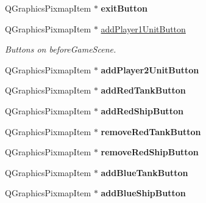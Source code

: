 \begin{DoxyCompactItemize}
\item 
Q\+Graphics\+Pixmap\+Item $\ast$ {\bfseries exit\+Button}\hypertarget{class_game_menu_a76bcbc6a772fb628f39140c9365eccd8}{}\label{class_game_menu_a76bcbc6a772fb628f39140c9365eccd8}

\item 
Q\+Graphics\+Pixmap\+Item $\ast$ \hyperlink{class_game_menu_aedcd8869665d66f9489ab41f0c038df8}{add\+Player1\+Unit\+Button}\hypertarget{class_game_menu_aedcd8869665d66f9489ab41f0c038df8}{}\label{class_game_menu_aedcd8869665d66f9489ab41f0c038df8}

\begin{DoxyCompactList}\small\item\em Buttons on before\+Game\+Scene. \end{DoxyCompactList}\item 
Q\+Graphics\+Pixmap\+Item $\ast$ {\bfseries add\+Player2\+Unit\+Button}\hypertarget{class_game_menu_a1027a5d9f67523cee6782d6413a75281}{}\label{class_game_menu_a1027a5d9f67523cee6782d6413a75281}

\item 
Q\+Graphics\+Pixmap\+Item $\ast$ {\bfseries add\+Red\+Tank\+Button}\hypertarget{class_game_menu_aab61d7c4576ad32880dd7ef88ed20ec8}{}\label{class_game_menu_aab61d7c4576ad32880dd7ef88ed20ec8}

\item 
Q\+Graphics\+Pixmap\+Item $\ast$ {\bfseries add\+Red\+Ship\+Button}\hypertarget{class_game_menu_a37bec2390eed30904e9c3a8ba96cc300}{}\label{class_game_menu_a37bec2390eed30904e9c3a8ba96cc300}

\item 
Q\+Graphics\+Pixmap\+Item $\ast$ {\bfseries remove\+Red\+Tank\+Button}\hypertarget{class_game_menu_a27d6aaab28d7b33fe1838a3bfd99d6b4}{}\label{class_game_menu_a27d6aaab28d7b33fe1838a3bfd99d6b4}

\item 
Q\+Graphics\+Pixmap\+Item $\ast$ {\bfseries remove\+Red\+Ship\+Button}\hypertarget{class_game_menu_aa3d84cd45a3fcb796c3f7e558dffdfc7}{}\label{class_game_menu_aa3d84cd45a3fcb796c3f7e558dffdfc7}

\item 
Q\+Graphics\+Pixmap\+Item $\ast$ {\bfseries add\+Blue\+Tank\+Button}\hypertarget{class_game_menu_a3bad751deea1957b875bdbda8543429b}{}\label{class_game_menu_a3bad751deea1957b875bdbda8543429b}

\item 
Q\+Graphics\+Pixmap\+Item $\ast$ {\bfseries add\+Blue\+Ship\+Button}\hypertarget{class_game_menu_a96db625de02a04609bef8a13a663110d}{}\label{class_game_menu_a96db625de02a04609bef8a13a663110d}


\end{DoxyCompactItemize}
